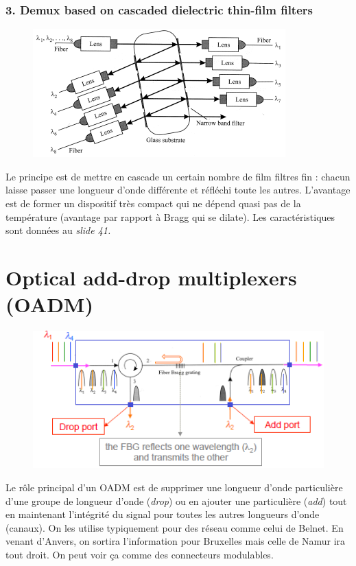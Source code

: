 \subsubsection{3. Demux based on cascaded dielectric thin-film filters}
	\begin{figure}
	\vspace{-5mm}
	\includegraphics[scale=0.65]{ch3/image27}
	\end{figure}
Le principe est de mettre en cascade un certain nombre de film filtres fin : chacun laisse passer
une longueur d'onde différente et réfléchi toute les autres. L'avantage est de former un dispositif
très compact qui ne dépend quasi pas de la température (avantage par rapport à Bragg qui se 
dilate). Les caractéristiques sont données au \textit{slide 41.}\\

\section{Optical add-drop multiplexers (OADM)}
	\begin{figure}
	\includegraphics[scale=0.7]{ch3/image28}
	\end{figure}
Le rôle principal d'un OADM est de supprimer une longueur d'onde particulière d'une groupe de
longueur d'onde (\textit{drop}) ou en ajouter une particulière (\textit{add}) tout en maintenant
l'intégrité du signal pour toutes les autres longueurs d'onde (canaux). On les utilise typiquement
pour des réseau comme celui de Belnet. En venant d'Anvers, on sortira l'information pour Bruxelles
mais celle de Namur ira tout droit. On peut voir ça comme des connecteurs modulables. 





















